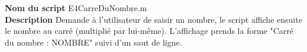 \textbf{Nom du script}
E4CarreDuNombre.m\\
\textbf{Description}
Demande à l'utilisateur de saisir un nombre, le script affiche ensuite le nombre au carré (multiplié par lui-même). L'affichage prends la forme "Carré du nombre : NOMBRE" suivi d'un saut de ligne.